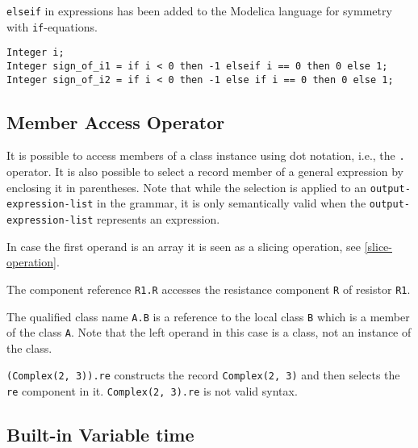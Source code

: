 \begin{nonnormative}
\lstinline!elseif! in expressions has been added to the Modelica language for symmetry with \lstinline!if!-equations.
\end{nonnormative}

\begin{example}
\begin{lstlisting}[language=modelica]
Integer i;
Integer sign_of_i1 = if i < 0 then -1 elseif i == 0 then 0 else 1;
Integer sign_of_i2 = if i < 0 then -1 else if i == 0 then 0 else 1;
\end{lstlisting}
\end{example}

\subsection{Member Access Operator}\label{member-access-operator}

It is possible to access members of a class instance using dot notation, i.e., the \lstinline!.! operator.
It is also possible to select a record member of a general expression by enclosing it in parentheses.
Note that while the selection is applied to an \lstinline[language=grammar]!output-expression-list! in the grammar, it is only semantically valid when the \lstinline[language=grammar]!output-expression-list! represents an expression.

In case the first operand is an array it is seen as a slicing operation, see \cref{slice-operation}.

\begin{example}
The component reference \lstinline!R1.R! accesses the resistance component \lstinline!R! of resistor \lstinline!R1!.

The qualified class name \lstinline!A.B! is a reference to the local class \lstinline!B! which is a member of the class \lstinline!A!.
Note that the left operand in this case is a class, not an instance of the class.

\lstinline!(Complex(2, 3)).re! constructs the record \lstinline!Complex(2, 3)! and then selects the \lstinline!re! component in it.
\lstinline!Complex(2, 3).re! is not valid syntax.
\end{example}

\subsection{Built-in Variable time}\label{built-in-variable-time}

